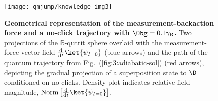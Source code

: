 \begin{figure}
\begin{centering}
\texttt{[image: qmjump/knowledge\_img3]}
\par\end{centering}
\caption[Geometrical representation of the measurement-backaction force and
a no-click trajectory with $\Obg=0.1\gamma_{{\rm B}}$]{\textbf{\label{fig:Knowledge-driven-force-in-2}Geometrical representation
of the measurement-backaction force and a no-click trajectory with
$\Obg=0.1\gamma_{{\rm B}}$.}  Two projections of the $\mathbb{\mathbb{\mathbb{R}}}$-qutrit
sphere overlaid with the measurement-force vector field $\frac{\mathrm{d}}{\mathrm{d}t}\ket{\psi_{I=0}}$
(blue arrows) and the path of the quantum trajectory from Fig.~(\ref{fig:3:adiabatic-sol})
(red arrows), depicting the gradual projection of a superposition
state to $\D$ conditioned on no clicks. Density plot indicates relative
field magnitude, $\mathrm{Norm}\left[\frac{\mathrm{d}}{\mathrm{d}t}\ket{\psi_{I=0}}\right]$.}
\end{figure}


